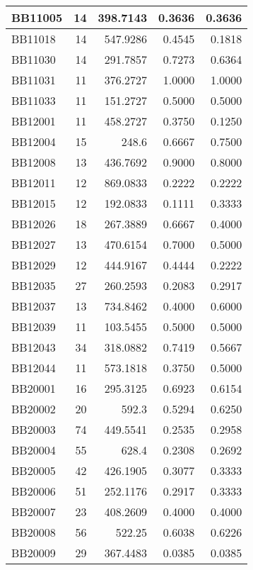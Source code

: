 \begin{longtable}{|l|r|r||r|r|}
	BB11005 & 14    & 398.7143 & 0.3636 & 0.3636 \\
	\hline
	BB11018 & 14    & 547.9286 & 0.4545 & 0.1818 \\
	\hline
	BB11030 & 14    & 291.7857 & 0.7273 & 0.6364 \\
	\hline
	BB11031 & 11    & 376.2727 & 1.0000 & 1.0000 \\
	\hline
	BB11033 & 11    & 151.2727 & 0.5000 & 0.5000 \\
	\hline
	BB12001 & 11    & 458.2727 & 0.3750 & 0.1250 \\
	\hline
	BB12004 & 15    & 248.6 & 0.6667 & 0.7500 \\
	\hline
	BB12008 & 13    & 436.7692 & 0.9000 & 0.8000 \\
	\hline
	BB12011 & 12    & 869.0833 & 0.2222 & 0.2222 \\
	\hline
	BB12015 & 12    & 192.0833 & 0.1111 & 0.3333 \\
	\hline
	BB12026 & 18    & 267.3889 & 0.6667 & 0.4000 \\
	\hline
	BB12027 & 13    & 470.6154 & 0.7000 & 0.5000 \\
	\hline
	BB12029 & 12    & 444.9167 & 0.4444 & 0.2222 \\
	\hline
	BB12035 & 27    & 260.2593 & 0.2083 & 0.2917 \\
	\hline
	BB12037 & 13    & 734.8462 & 0.4000 & 0.6000 \\
	\hline
	BB12039 & 11    & 103.5455 & 0.5000 & 0.5000 \\
	\hline
	BB12043 & 34    & 318.0882 & 0.7419 & 0.5667 \\
	\hline
	BB12044 & 11    & 573.1818 & 0.3750 & 0.5000 \\
	\hline
	BB20001 & 16    & 295.3125 & 0.6923 & 0.6154 \\
	\hline
	BB20002 & 20    & 592.3 & 0.5294 & 0.6250 \\
	\hline
	BB20003 & 74    & 449.5541 & 0.2535 & 0.2958 \\
	\hline
	BB20004 & 55    & 628.4 & 0.2308 & 0.2692 \\
	\hline
	BB20005 & 42    & 426.1905 & 0.3077 & 0.3333 \\
	\hline
	BB20006 & 51    & 252.1176 & 0.2917 & 0.3333 \\
	\hline
	BB20007 & 23    & 408.2609 & 0.4000 & 0.4000 \\
	\hline
	BB20008 & 56    & 522.25 & 0.6038 & 0.6226 \\
	\hline
	BB20009 & 29    & 367.4483 & 0.0385 & 0.0385 \\

\end{longtable}
